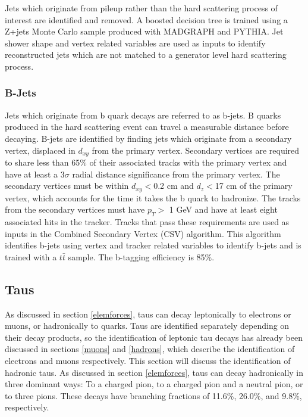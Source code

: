 \documentclass[oneside, letterpaper, oldfontcommands]{memoir}
\begin{document}
\qquad Jets which originate from pileup rather than the hard scattering process of interest are identified and removed. A boosted decision tree is trained using a Z+jets Monte Carlo sample produced with MADGRAPH and PYTHIA. Jet shower shape and vertex related variables are used as inputs to identify reconstructed jets which are not matched to a generator level hard scattering process. \cite{CMS-PAS-JME-13-005} 

\subsubsection{B-Jets}\label{bjets}
\qquad Jets which originate from b quark decays are referred to as b-jets. B quarks produced in the hard scattering event can travel a measurable distance before decaying. B-jets are identified by finding jets which originate from a secondary vertex, displaced in $d_{xy}$ from the primary vertex. Secondary vertices are required to share less than 65\% of their associated tracks with the primary vertex and have at least a 3$\sigma$ radial distance significance from the primary vertex. The secondary vertices must be within $d_{xy} <$0.2 cm and $d_{z} <$17 cm of the primary vertex, which accounts for the time it takes the b quark to hadronize. The tracks from the secondary vertices must have $p_{T} >$ 1 GeV and have at least eight associated hits in the tracker. Tracks that pass these requirements are used as inputs in the Combined Secondary Vertex (CSV) algorithm. This algorithm identifies b-jets using vertex and tracker related variables to identify b-jets and is trained with a $t\bar{t}$ sample. The b-tagging efficiency is 85\%. \cite{Chatrchyan:2012jua}

\subsection{Taus}\label{taus}

\qquad As discussed in section \ref{elemforces}, taus can decay leptonically to electrons or muons, or hadronically to quarks. Taus are identified separately depending on their decay products, so the identification of leptonic tau decays has already been discussed in sections \ref{muons} and \ref{hadrons}, which describe the identification of electrons and muons respectively. This section will discuss the identification of hadronic taus. As discussed in section \ref{elemforces}, taus can decay hadronically in three dominant ways: To a charged pion, to a charged pion and a neutral pion, or to three pions. These decays have branching fractions of 11.6\%, 26.0\%, and 9.8\%, respectively.
\end{document}
